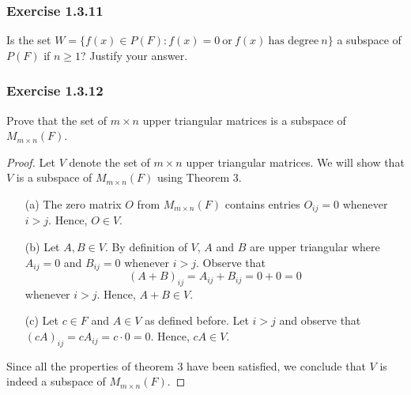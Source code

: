 \subsubsection{Exercise 1.3.11} Is the set \( W = \{ f(x) \in P(F) : f(x) = 0 \ \text{or} \  f(x) \ \text{has degree} \ n \}  \) a subspace of \( P(F)  \) if \( n \geq 1  \)? Justify your answer.


\subsubsection{Exercise 1.3.12} Prove that the set of \( m \times n  \) upper triangular matrices is a subspace of \( M_{m \times n}(F) \).
\begin{proof}
    Let \( V  \) denote the set of \( m \times n  \) upper triangular matrices. We will show that \( V  \) is a subspace of \( M_{m \times n}(F)  \) using Theorem 3. 
    \begin{enumerate}
        \item[(a)] The zero matrix \( O \) from \( M_{m \times n}(F) \) contains entries \( O_{ij} = 0  \) whenever \( i > j  \). Hence, \( O \in V \).
        \item[(b)] Let \( A, B \in V  \). By definition of \( V  \), \( A  \) and \( B \) are upper triangular where \(  A_{ij} = 0  \) and \( B_{ij} = 0  \) whenever \( i > j   \). Observe that 
            \[ (A + B)_{ij} = A_{ij} + B_{ij} = 0 + 0 = 0  \]
            whenever \( i > j  \).
        Hence, \( A + B \in V  \).
    \item[(c)] Let \( c \in F  \) and \( A \in V  \) as defined before. Let \( i > j  \) and observe that \( (cA)_{ij} = c A_{ij} = c \cdot 0 = 0   \). Hence, \( cA \in V  \). 
    \end{enumerate}
    Since all the properties of theorem 3 have been satisfied, we conclude that \( V  \) is indeed a subspace of \( M_{m \times n}(F) \).
\end{proof}


